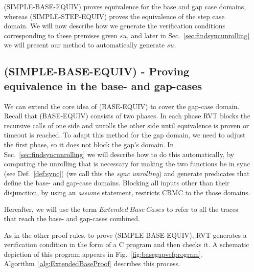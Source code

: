 (SIMPLE-BASE-EQUIV) proves equivalence for the base and gap case domains, whereas (SIMPLE-STEP-EQUIV) proves the equivalence of the step case domain. We will now describe how we generate the verification conditions corresponding to these premises given $su$, and later in Sec.~\ref{sec:findsyncunrolling} we will present our method to automatically generate $su$.

\subsection{(SIMPLE-BASE-EQUIV) - Proving equivalence in the base- and gap-cases}\label{sec:SIMPLE-BASE-EQUIV}
We can extend the core idea of (BASE-EQUIV) to cover the gap-case domain. Recall that (BASE-EQUIV) consists of two phases. In each phase RVT blocks the recursive calls of one side and unrolls the other side until equivalence is proven or timeout is reached. To adapt this method for the gap domain, we need to adjust the first phase, so it does not block the gap's domain. In Sec.~\ref{sec:findsyncunrolling} we will describe how to do this automatically, by computing the unrolling that is necessary for making the two functions be in sync (see Def.~\ref{def:sync}) (we call this the \emph{sync unrolling}) and generate predicates that define the base- and gap-case domains. Blocking all inputs other than their disjunction, by using an \emph{assume} statement, restricts CBMC to the those domains. 


Hereafter, we will use the term $Extended\ Base\ Cases$ to refer to all the traces that reach the base- and gap-cases combined. 

As in the other proof rules, to prove (SIMPLE-BASE-EQUIV), RVT generates a verification condition in the form of a C program and then checks it. A schematic depiction of this program appears in Fig.~\ref{fig:basegapvefprogram}. Algorithm~\ref{alg:ExtendedBaseProof} describes this process. 

